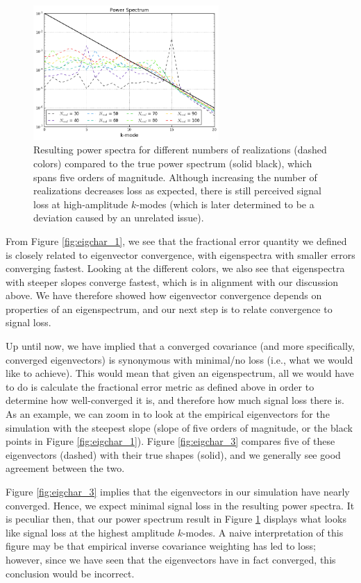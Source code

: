 \begin{figure}
    \centering
	\includegraphics[width=0.63\textwidth]{plots/eigchar_2.png}    
	\caption{Resulting power spectra for different numbers of realizations (dashed colors) compared to the true power spectrum (solid black), which spans five orders of magnitude. Although increasing the number of realizations decreases loss as expected, there is still perceived signal loss at high-amplitude $k$-modes (which is later determined to be a deviation caused by an unrelated issue).}
    \label{fig:eigchar_2}
\end{figure}

From Figure \ref{fig:eigchar_1}, we see that the fractional error quantity we defined is closely related to eigenvector convergence, with eigenspectra with smaller errors converging fastest. Looking at the different colors, we also see that eigenspectra with steeper slopes converge fastest, which is in alignment with our discussion above. We have therefore showed how eigenvector convergence depends on properties of an eigenspectrum, and our next step is to relate convergence to signal loss. 

Up until now, we have implied that a converged covariance (and more specifically, converged eigenvectors) is synonymous with minimal/no loss (i.e., what we would like to achieve). This would mean that given an eigenspectrum, all we would have to do is calculate the fractional error metric as defined above in order to determine how well-converged it is, and therefore how much signal loss there is. As an example, we can zoom in to look at the empirical eigenvectors for the simulation with the steepest slope (slope of five orders of magnitude, or the black points in Figure \ref{fig:eigchar_1}). Figure \ref{fig:eigchar_3} compares five of these eigenvectors (dashed) with their true shapes (solid), and we generally see good agreement between the two.

Figure \ref{fig:eigchar_3} implies that the eigenvectors in our simulation have nearly converged. Hence, we expect minimal signal loss in the resulting power spectra. It is peculiar then, that our power spectrum result in Figure \ref{fig:eigchar_2} displays what looks like signal loss at the highest amplitude $k$-modes. A naive interpretation of this figure may be that empirical inverse covariance weighting has led to loss; however, since we have seen that the eigenvectors have in fact converged, this conclusion would be incorrect.

